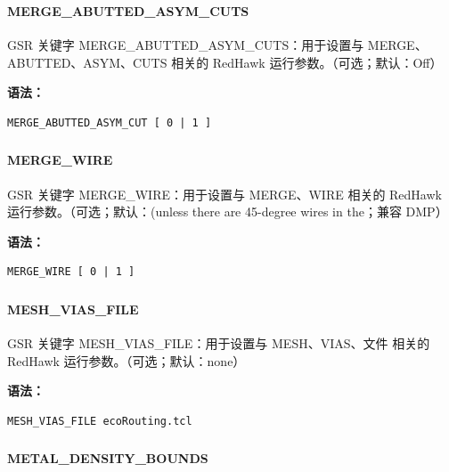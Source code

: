 \subsubsection{}
\paragraph*{MERGE_ABUTTED_ASYM_CUTS}

GSR 关键字 MERGE_ABUTTED_ASYM_CUTS：用于设置与 MERGE、ABUTTED、ASYM、CUTS 相关的 RedHawk 运行参数。（可选；默认：Off）

\textbf{语法：}
\begin{lstlisting}
MERGE_ABUTTED_ASYM_CUT [ 0 | 1 ]
\end{lstlisting}

\subsubsection{}
\paragraph*{MERGE_WIRE}

GSR 关键字 MERGE_WIRE：用于设置与 MERGE、WIRE 相关的 RedHawk 运行参数。（可选；默认：(unless there are 45-degree wires in the；兼容 DMP）

\textbf{语法：}
\begin{lstlisting}
MERGE_WIRE [ 0 | 1 ]
\end{lstlisting}

\subsubsection{}
\paragraph*{MESH_VIAS_FILE}

GSR 关键字 MESH_VIAS_FILE：用于设置与 MESH、VIAS、文件 相关的 RedHawk 运行参数。（可选；默认：none）

\textbf{语法：}
\begin{lstlisting}
MESH_VIAS_FILE ecoRouting.tcl
\end{lstlisting}

\subsubsection{}
\paragraph*{METAL_DENSITY_BOUNDS}


